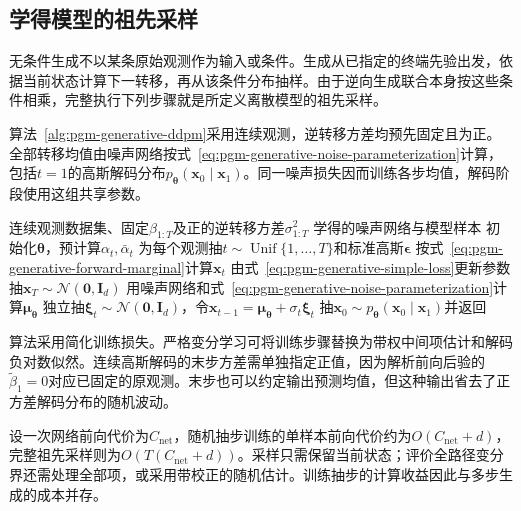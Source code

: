 \subsection{学得模型的祖先采样}
\label{sec:pgm-generative-ancestral-generation}

无条件生成不以某条原始观测作为输入或条件。生成从已指定的终端先验出发，依据当前状态计算下一转移，再从该条件分布抽样。由于逆向生成联合本身按这些条件相乘，完整执行下列步骤就是所定义离散模型的祖先采样。

算法~\ref{alg:pgm-generative-ddpm}采用连续观测，逆转移方差均预先固定且为正。全部转移均值由噪声网络按式~\eqref{eq:pgm-generative-noise-parameterization}计算，包括$t=1$的高斯解码分布$p_{\bm{\theta}}(\bm{x}_0\mid\bm{x}_1)$。同一噪声损失因而训练各步均值，解码阶段使用这组共享参数。

\par\noindent\begin{minipage}{\linewidth}
\begin{algorithm}[固定方差DDPM的学习与祖先采样]
  \label{alg:pgm-generative-ddpm}
  \begin{algorithmic}[1]
    \Require 连续观测数据集、固定$\beta_{1:T}$及正的逆转移方差$\sigma_{1:T}^2$
    \Ensure 学得的噪声网络与模型样本
    \State 初始化$\bm{\theta}$，预计算$\alpha_t,\bar{\alpha}_t$
      \State 为每个观测抽$t\sim\operatorname{Unif}\{1,\ldots,T\}$和标准高斯$\bm{\epsilon}$
      \State 按式~\eqref{eq:pgm-generative-forward-marginal}计算$\bm{x}_t$
      \State 由式~\eqref{eq:pgm-generative-simple-loss}更新参数
    \EndFor
    \State 抽$\bm{x}_T\sim\mathcal{N}(\bm{0},\bm{I}_d)$
      \State 用噪声网络和式~\eqref{eq:pgm-generative-noise-parameterization}计算$\bm{\mu}_{\bm{\theta}}$
      \State 独立抽$\bm{\xi}_t\sim\mathcal{N}(\bm{0},\bm{I}_d)$，令$\bm{x}_{t-1}=\bm{\mu}_{\bm{\theta}}+\sigma_t\bm{\xi}_t$
    \EndFor
    \State 抽$\bm{x}_0\sim p_{\bm{\theta}}(\bm{x}_0\mid\bm{x}_1)$并返回
  \end{algorithmic}
\end{algorithm}
\end{minipage}\par

算法采用简化训练损失。严格变分学习可将训练步骤替换为带权中间项估计和解码负对数似然。连续高斯解码的末步方差需单独指定正值，因为解析前向后验的$\widetilde{\beta}_1=0$对应已固定的原观测。末步也可以约定输出预测均值，但这种输出省去了正方差解码分布的随机波动。

设一次网络前向代价为$C_{\mathrm{net}}$，随机抽步训练的单样本前向代价约为$O(C_{\mathrm{net}}+d)$，完整祖先采样则为$O(T(C_{\mathrm{net}}+d))$。采样只需保留当前状态；评价全路径变分界还需处理全部项，或采用带校正的随机估计。训练抽步的计算收益因此与多步生成的成本并存。

